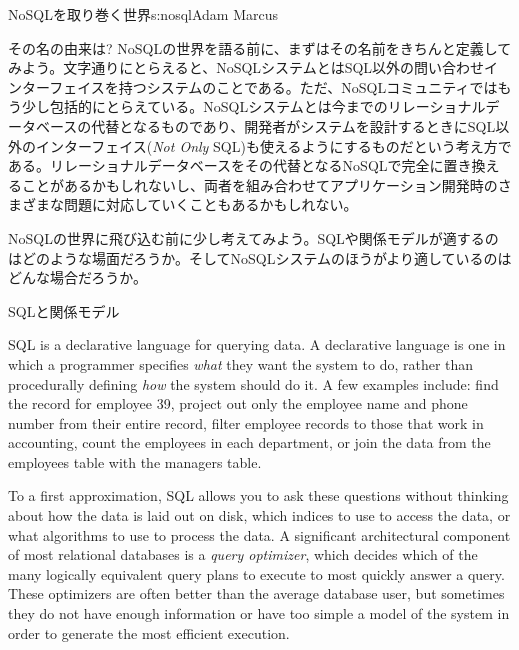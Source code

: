 \begin{aosachapter}{NoSQLを取り巻く世界}{s:nosql}{Adam Marcus}
\begin{aosasect1}{その名の由来は?}
NoSQLの世界を語る前に、まずはその名前をきちんと定義してみよう。文字通りにとらえると、NoSQLシステムとはSQL以外の問い合わせインターフェイスを持つシステムのことである。ただ、NoSQLコミュニティではもう少し包括的にとらえている。NoSQLシステムとは今までのリレーショナルデータベースの代替となるものであり、開発者がシステムを設計するときにSQL以外のインターフェイス(\emph{Not Only} SQL)も使えるようにするものだという考え方である。リレーショナルデータベースをその代替となるNoSQLで完全に置き換えることがあるかもしれないし、両者を組み合わせてアプリケーション開発時のさまざまな問題に対応していくこともあるかもしれない。

NoSQLの世界に飛び込む前に少し考えてみよう。SQLや関係モデルが適するのはどのような場面だろうか。そしてNoSQLシステムのほうがより適しているのはどんな場合だろうか。

\begin{aosasect2}{SQLと関係モデル}

SQL is a declarative language for querying data.  A declarative
language is one in which a programmer specifies \emph{what} they want
the system to do, rather than procedurally defining \emph{how} the
system should do it.  A few examples include: find the record for
employee 39, project out only the employee name and phone number from
their entire record, filter employee records to those that work in
accounting, count the employees in each department, or join the data
from the employees table with the managers table.

To a first approximation, SQL allows you to ask these questions without
thinking about how the data is laid out on disk, which indices to use
to access the data, or what algorithms to use to process the data.  A
significant architectural component of most relational databases is a
\emph{query optimizer}, which decides which of the many logically
equivalent query plans to execute to most quickly answer a query.
These optimizers are often better than the average database user, but
sometimes they do not have enough information or have too simple a
model of the system in order to generate the most efficient execution.


\end{aosasect2}
\end{aosasect1}
\end{aosachapter}
